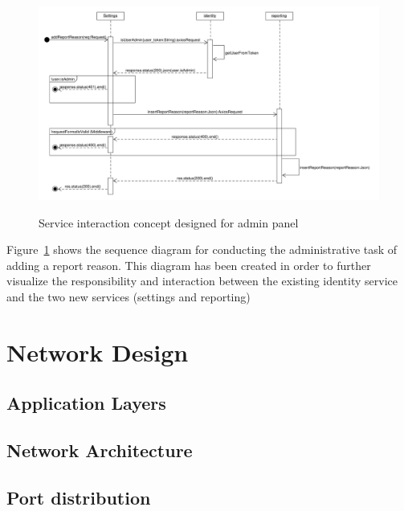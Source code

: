 \begin{figure}[h]
	\centering
	\caption{Service interaction concept designed for admin panel}
	\includegraphics[width=1.0\textwidth]{./images/SequenceDiagram_AddReportReason.pdf}
	\label{fig:sequenceDiagramAddReportReason}
\end{figure}

Figure~\ref{fig:sequenceDiagramAddReportReason} shows the sequence diagram for conducting the administrative task of adding a report reason. This diagram has been created in order to further visualize the responsibility and interaction between the existing identity service and the two new services (settings and reporting)

\section{Network Design}\label{sec:network-design}

\subsection{Application Layers}\label{subsec:application-layers}

\subsection{Network Architecture}\label{subsec:network-architecture}

\subsection{Port distribution}\label{subsec:port-distribution}

